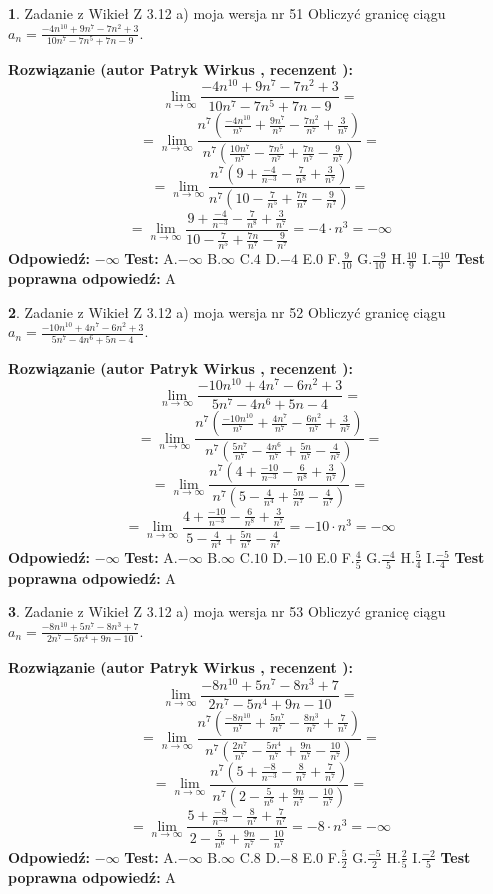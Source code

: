 \documentclass[12pt, a4paper]{article}
\theoremstyle{definition} %
\newtheorem{zad}{}
\newcommand{\zadStart}[1]{\begin{zad}#1\newline}
\newcommand{\zadStop}{\end{zad}}
\newcommand{\rozwStart}[2]{\noindent \textbf{Rozwiązanie (autor #1 , recenzent #2): }\newline}
\newcommand{\rozwStop}{\newline}
\newcommand{\odpStart}{\noindent \textbf{Odpowiedź:}\newline}
\newcommand{\odpStop}{\newline}
\newcommand{\testStart}{\noindent \textbf{Test:}\newline}
\newcommand{\testStop}{\newline}
\newcommand{\kluczStart}{\noindent \textbf{Test poprawna odpowiedź:}\newline}
\newcommand{\kluczStop}{\newline}
\begin{document}
\zadStart{Zadanie z Wikieł Z 3.12 a) moja wersja nr 51}
Obliczyć granicę ciągu $a_{n}=\frac{-4n^{10}+9n^{7}-7n^{2}+3}{10n^{7}-7n^{5}+7n-9}$.
\zadStop
\rozwStart{Patryk Wirkus}{}
$$\lim\limits_{n\to\infty}\frac{-4n^{10}+9n^{7}-7n^{2}+3}{10n^{7}-7n^{5}+7n-9}=$$
$$=\lim\limits_{n\to\infty}\frac{n^{7}\left(\frac{-4n^{10}}{n^{7}}+\frac{9n^{7}}{n^{7}}-\frac{7n^{2}}{n^{7}}+\frac{3}{n^{7}}\right)}{n^{7}\left(\frac{10n^{7}}{n^{7}}-\frac{7n^{5}}{n^{7}}+\frac{7n}{n^{7}}-\frac{9}{n^{7}}\right)}=$$
$$=\lim\limits_{n\to\infty}\frac{n^{7}\left(9+\frac{-4}{n^{-3}}-\frac{7}{n^{8}}+\frac{3}{n^{7}}\right)}
{n^{7}\left(10-\frac{7}{n^{5}}+\frac{7n}{n^{7}}-\frac{9}{n^{7}}\right)}=$$
$$=\lim\limits_{n\to\infty}\frac{9+\frac{-4}{n^{-3}}-\frac{7}{n^{8}}+\frac{3}{n^{7}}}{10-\frac{7}{n^{5}}+\frac{7n}{n^{7}}-\frac{9}{n^{7}}}=-4\cdot n^{3} = -\infty$$
\rozwStop
\odpStart
$-\infty$
\odpStop
\testStart
A.$-\infty$
B.$\infty$
C.$4$
D.$-4$
E.$0$
F.$\frac{9}{10}$
G.$\frac{-9}{10}$
H.$\frac{10}{9}$
I.$\frac{-10}{9}$
\testStop
\kluczStart
A
\kluczStop



\zadStart{Zadanie z Wikieł Z 3.12 a) moja wersja nr 52}
Obliczyć granicę ciągu $a_{n}=\frac{-10n^{10}+4n^{7}-6n^{2}+3}{5n^{7}-4n^{6}+5n-4}$.
\zadStop
\rozwStart{Patryk Wirkus}{}
$$\lim\limits_{n\to\infty}\frac{-10n^{10}+4n^{7}-6n^{2}+3}{5n^{7}-4n^{6}+5n-4}=$$
$$=\lim\limits_{n\to\infty}\frac{n^{7}\left(\frac{-10n^{10}}{n^{7}}+\frac{4n^{7}}{n^{7}}-\frac{6n^{2}}{n^{7}}+\frac{3}{n^{7}}\right)}{n^{7}\left(\frac{5n^{7}}{n^{7}}-\frac{4n^{6}}{n^{7}}+\frac{5n}{n^{7}}-\frac{4}{n^{7}}\right)}=$$
$$=\lim\limits_{n\to\infty}\frac{n^{7}\left(4+\frac{-10}{n^{-3}}-\frac{6}{n^{8}}+\frac{3}{n^{7}}\right)}
{n^{7}\left(5-\frac{4}{n^{4}}+\frac{5n}{n^{7}}-\frac{4}{n^{7}}\right)}=$$
$$=\lim\limits_{n\to\infty}\frac{4+\frac{-10}{n^{-3}}-\frac{6}{n^{8}}+\frac{3}{n^{7}}}{5-\frac{4}{n^{4}}+\frac{5n}{n^{7}}-\frac{4}{n^{7}}}=-10\cdot n^{3} = -\infty$$
\rozwStop
\odpStart
$-\infty$
\odpStop
\testStart
A.$-\infty$
B.$\infty$
C.$10$
D.$-10$
E.$0$
F.$\frac{4}{5}$
G.$\frac{-4}{5}$
H.$\frac{5}{4}$
I.$\frac{-5}{4}$
\testStop
\kluczStart
A
\kluczStop



\zadStart{Zadanie z Wikieł Z 3.12 a) moja wersja nr 53}
Obliczyć granicę ciągu $a_{n}=\frac{-8n^{10}+5n^{7}-8n^{3}+7}{2n^{7}-5n^{4}+9n-10}$.
\zadStop
\rozwStart{Patryk Wirkus}{}
$$\lim\limits_{n\to\infty}\frac{-8n^{10}+5n^{7}-8n^{3}+7}{2n^{7}-5n^{4}+9n-10}=$$
$$=\lim\limits_{n\to\infty}\frac{n^{7}\left(\frac{-8n^{10}}{n^{7}}+\frac{5n^{7}}{n^{7}}-\frac{8n^{3}}{n^{7}}+\frac{7}{n^{7}}\right)}{n^{7}\left(\frac{2n^{7}}{n^{7}}-\frac{5n^{4}}{n^{7}}+\frac{9n}{n^{7}}-\frac{10}{n^{7}}\right)}=$$
$$=\lim\limits_{n\to\infty}\frac{n^{7}\left(5+\frac{-8}{n^{-3}}-\frac{8}{n^{7}}+\frac{7}{n^{7}}\right)}
{n^{7}\left(2-\frac{5}{n^{6}}+\frac{9n}{n^{7}}-\frac{10}{n^{7}}\right)}=$$
$$=\lim\limits_{n\to\infty}\frac{5+\frac{-8}{n^{-3}}-\frac{8}{n^{7}}+\frac{7}{n^{7}}}{2-\frac{5}{n^{6}}+\frac{9n}{n^{7}}-\frac{10}{n^{7}}}=-8\cdot n^{3} = -\infty$$
\rozwStop
\odpStart
$-\infty$
\odpStop
\testStart
A.$-\infty$
B.$\infty$
C.$8$
D.$-8$
E.$0$
F.$\frac{5}{2}$
G.$\frac{-5}{2}$
H.$\frac{2}{5}$
I.$\frac{-2}{5}$
\testStop
\kluczStart
A
\kluczStop
\end{document}
